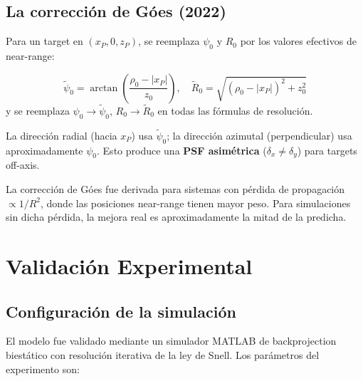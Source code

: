 \documentclass[12pt,a4paper,oneside]{book}
\newcommand{\result}[2]{%
  \begin{tcolorbox}[enhanced, breakable,
    colback=yellow!8, colframe=orange!70!black,
    fonttitle=\bfseries,
    title={\protect#1},
    attach boxed title to top left={yshift=-2mm, xshift=5mm},
    boxed title style={colback=orange!70!black}]
    #2
  \end{tcolorbox}}
\newcommand{\nota}[2]{%
  \begin{tcolorbox}[enhanced, breakable,
    colback=green!5, colframe=green!50!black,
    fonttitle=\bfseries\small,
    title={\protect#1}]
    #2
  \end{tcolorbox}}
\begin{document}
\section{La corrección de Góes (2022)}

Para un target en $(x_P, 0, z_P)$, se reemplaza $\psi_0$ y $R_0$ por los valores efectivos de near-range:

\result{Corrección Off-Axis (Góes 2022)}{
\[
\tilde{\psi}_0 = \arctan\!\left(\frac{\rho_0-|x_P|}{z_0}\right),\quad \tilde{R}_0 = \sqrt{(\rho_0-|x_P|)^2+z_0^2}
\]
y se reemplaza $\psi_0 \to \tilde{\psi}_0$, $R_0 \to \tilde{R}_0$ en todas las fórmulas de resolución.
}

La dirección radial (hacia $x_P$) usa $\tilde{\psi}_0$; la dirección azimutal (perpendicular) usa aproximadamente $\psi_0$. Esto produce una \textbf{PSF asimétrica} ($\delta_x \neq \delta_y$) para targets off-axis.

\nota{Condición de validez de la corrección}{
La corrección de Góes fue derivada para sistemas con pérdida de propagación $\propto 1/R^2$, donde las posiciones near-range tienen mayor peso. Para simulaciones sin dicha pérdida, la mejora real es aproximadamente la mitad de la predicha.
}

\chapter{Validación Experimental}

\section{Configuración de la simulación}

El modelo fue validado mediante un simulador MATLAB de backprojection biestático con resolución iterativa de la ley de Snell. Los parámetros del experimento son:
\end{document}
